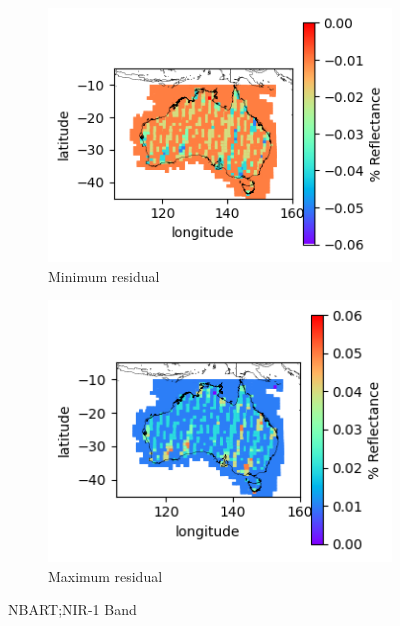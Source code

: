 \documentclass[a4paper]{article}
\begin{document}
      \begin{figure}[h!]
        \centering
          \begin{subfigure}[l]{.4\linewidth}
            \hspace{-32mm}
            \includegraphics[scale=0.9]{plots/nbart/nbart_nir_1-MinResidual.png}
            \caption{Minimum residual}
          \end{subfigure}
%
          \begin{subfigure}[r]{.4\linewidth}
            \includegraphics[scale=0.9]{plots/nbart/nbart_nir_1-MaxResidual.png}
            \caption{Maximum residual}
          \end{subfigure}
        \caption{NBART;\@ NIR-1 Band}\label{figure:15}
      \end{figure}
\end{document}
